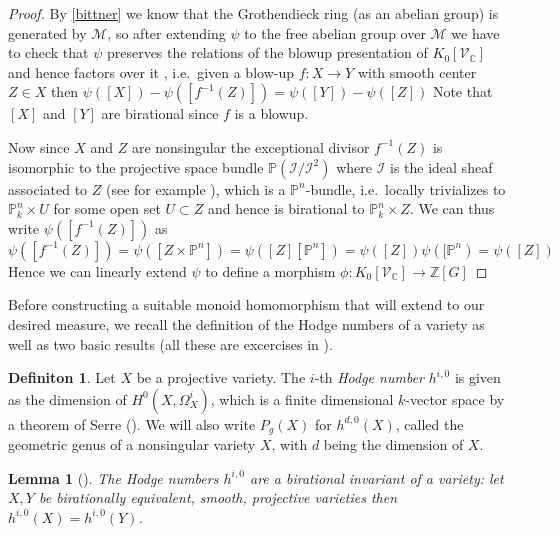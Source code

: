 \documentclass[11pt, a4paper, german]{article}
\theoremstyle{plain}
\newtheorem{lemma}[theorem]{Lemma}
\theoremstyle{definition}
\newtheorem{definition}[theorem]{Definiton}
\newcommand{\gring}[1][k]{K_0[\mathcal{V}_#1]}
\begin{document}
\begin{proof}
    By \ref{bittner} we know that the Grothendieck ring (as an abelian group) is generated by $\mathcal{M}$, so after extending $\psi$ to
    the free abelian group over $\mathcal{M}$ 
    we have to check that $\psi$ preserves the relations of the blowup presentation of $\gring[\mathbb{C}]$ and hence factors over it
    , i.e.\ given a blow-up $f \colon X \to Y$ with smooth center $Z \in X$ then $\psi([X]) - \psi([f^{-1}(Z)]) = \psi([Y]) - \psi([Z])$  
    Note that $[X]$ and $[Y]$ are birational since $f$ is a blowup.
    
    Now since $X$ and $Z$ are nonsingular the exceptional divisor $f^{-1}(Z)$ is isomorphic to 
    the projective space bundle  $\mathbb{P}(\mathcal{I}/\mathcal{I}^2)$ 
    where $\mathcal{I}$ is the ideal sheaf associated to $Z$ (see for example \cite[II.8, Thm 8.24]{Ha}),
    which is a $\mathbb{P}^n$-bundle, i.e.\ locally trivializes to $\mathbb{P}_k^n \times U$ for some open set $U \subset Z$
    and hence is birational to $\mathbb{P}_k^n \times Z$. 
    We can thus write $\psi([f^{-1}(Z)])$ as  
    \[
        \psi([f^{-1}(Z)]) = \psi([Z \times \mathbb{P}^n]) = \psi([Z][\mathbb{P}^n]) = \psi([Z])\psi([\mathbb{P}^n) = \psi([Z])
    \]
    Hence we can linearly extend $\psi$ to define a morphism $\phi \colon \gring[\mathbb{C}] \to \mathbb{Z} [G]$
\end{proof}

Before constructing a suitable monoid homomorphism that will extend to our desired measure, we recall the definition of the Hodge numbers
of a variety as well as two basic results (all these are excercises in \cite[Ch. II]{Ha}).

\begin{definition}
    Let $X$ be a projective variety. The $i$-th \emph{Hodge number} $h^{i,0}$ is given as the dimension of $H^0(X,\Omega^i_X)$, 
    which is a finite dimensional $k$-vector space by a theorem of Serre (\cite[§3 Prop. 7]{FAC}).
    We will also write $P_g(X)$ for $h^{d,0}(X)$, called the geometric genus of a nonsingular variety $X$, with $d$ being the dimension of $X$.
\end{definition}

\begin{lemma}[{\cite[II Ex. 8.8]{Ha}}]
    \label{bir}
    The Hodge numbers $h^{i,0}$ are a birational invariant of a variety: let $X, Y$ be birationally equivalent, smooth, projective varieties
    then $h^{i,0}(X) = h^{i,0}(Y)$.
\end{lemma}
\end{document}
